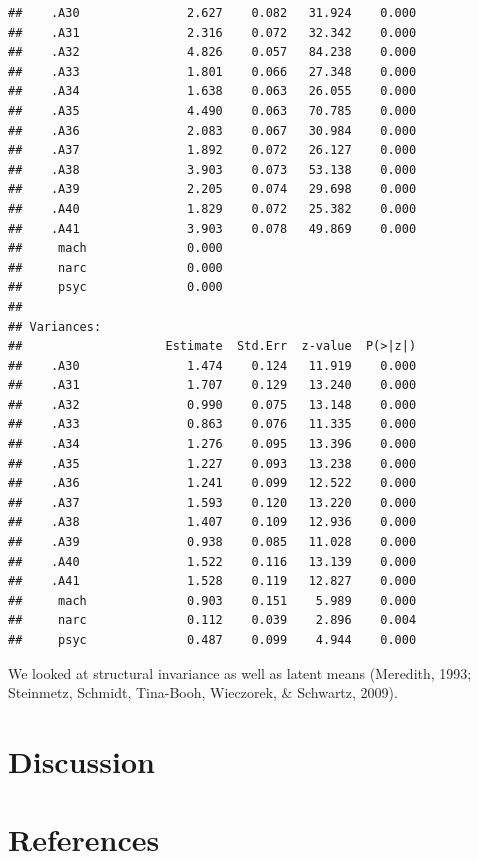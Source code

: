\documentclass[
  english,
  man]{apa6}
\begin{document}
\begin{verbatim}
##    .A30               2.627    0.082   31.924    0.000
##    .A31               2.316    0.072   32.342    0.000
##    .A32               4.826    0.057   84.238    0.000
##    .A33               1.801    0.066   27.348    0.000
##    .A34               1.638    0.063   26.055    0.000
##    .A35               4.490    0.063   70.785    0.000
##    .A36               2.083    0.067   30.984    0.000
##    .A37               1.892    0.072   26.127    0.000
##    .A38               3.903    0.073   53.138    0.000
##    .A39               2.205    0.074   29.698    0.000
##    .A40               1.829    0.072   25.382    0.000
##    .A41               3.903    0.078   49.869    0.000
##     mach              0.000                           
##     narc              0.000                           
##     psyc              0.000                           
## 
## Variances:
##                    Estimate  Std.Err  z-value  P(>|z|)
##    .A30               1.474    0.124   11.919    0.000
##    .A31               1.707    0.129   13.240    0.000
##    .A32               0.990    0.075   13.148    0.000
##    .A33               0.863    0.076   11.335    0.000
##    .A34               1.276    0.095   13.396    0.000
##    .A35               1.227    0.093   13.238    0.000
##    .A36               1.241    0.099   12.522    0.000
##    .A37               1.593    0.120   13.220    0.000
##    .A38               1.407    0.109   12.936    0.000
##    .A39               0.938    0.085   11.028    0.000
##    .A40               1.522    0.116   13.139    0.000
##    .A41               1.528    0.119   12.827    0.000
##     mach              0.903    0.151    5.989    0.000
##     narc              0.112    0.039    2.896    0.004
##     psyc              0.487    0.099    4.944    0.000
\end{verbatim}

We looked at structural invariance as well as latent means (Meredith, 1993; Steinmetz, Schmidt, Tina-Booh, Wieczorek, \& Schwartz, 2009).

\hypertarget{discussion}{%
\section{Discussion}\label{discussion}}

\newpage

\hypertarget{references}{%
\section{References}\label{references}}
\end{document}
